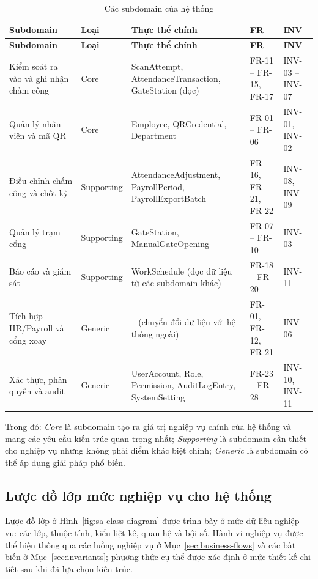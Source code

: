 \begingroup
\small
\renewcommand{\arraystretch}{1.2}
\begin{longtable}{|>{\raggedright\arraybackslash}m{3.6cm}|>{\centering\arraybackslash}m{1.8cm}|>{\raggedright\arraybackslash}m{4.6cm}|>{\raggedright\arraybackslash}m{2.4cm}|>{\raggedright\arraybackslash}m{2.6cm}|}
    \caption{Các subdomain của hệ thống}\label{tab:subdomains}\\
    \hline
    \textbf{Subdomain} & \textbf{Loại} & \textbf{Thực thể chính} & \textbf{FR} & \textbf{INV}\\
    \hline
    \endfirsthead
    \hline
    \textbf{Subdomain} & \textbf{Loại} & \textbf{Thực thể chính} & \textbf{FR} & \textbf{INV}\\
    \hline
    \endhead
    \hline
    \endfoot
    \hline
    \endlastfoot
    Kiểm soát ra vào và ghi nhận chấm công & Core & ScanAttempt, AttendanceTransaction, GateStation (đọc) & FR-11 -- FR-15, FR-17 & INV-03 -- INV-07\\
    \hline
    Quản lý nhân viên và mã QR & Core & Employee, QRCredential, Department & FR-01 -- FR-06 & INV-01, INV-02\\
    \hline
    Điều chỉnh chấm công và chốt kỳ & Supporting & AttendanceAdjustment, PayrollPeriod, PayrollExportBatch & FR-16, FR-21, FR-22 & INV-08, INV-09\\
    \hline
    Quản lý trạm cổng & Supporting & GateStation, ManualGateOpening & FR-07 -- FR-10 & INV-03\\
    \hline
    Báo cáo và giám sát & Supporting & WorkSchedule (đọc dữ liệu từ các subdomain khác) & FR-18 -- FR-20 & INV-11\\
    \hline
    Tích hợp HR/Payroll và cổng xoay & Generic & -- (chuyển đổi dữ liệu với hệ thống ngoài) & FR-01, FR-12, FR-21 & INV-06\\
    \hline
    Xác thực, phân quyền và audit & Generic & UserAccount, Role, Permission, AuditLogEntry, SystemSetting & FR-23 -- FR-28 & INV-10, INV-11\\
    \hline
\end{longtable}
\endgroup

\noindent Trong đó: \textit{Core} là subdomain tạo ra giá trị nghiệp vụ chính của hệ thống và mang các yêu cầu kiến trúc quan trọng nhất; \textit{Supporting} là subdomain cần thiết cho nghiệp vụ nhưng không phải điểm khác biệt chính; \textit{Generic} là subdomain có thể áp dụng giải pháp phổ biến.

\subsection{Lược đồ lớp mức nghiệp vụ cho hệ thống}\label{sec:class-diagram}
Lược đồ lớp ở Hình~\ref{fig:sa-class-diagram} được trình bày ở mức dữ liệu nghiệp vụ: các lớp, thuộc tính, kiểu liệt kê, quan hệ và bội số. Hành vi nghiệp vụ được thể hiện thông qua các luồng nghiệp vụ ở Mục~\ref{sec:business-flows} và các bất biến ở Mục~\ref{sec:invariants}; phương thức cụ thể được xác định ở mức thiết kế chi tiết sau khi đã lựa chọn kiến trúc.

